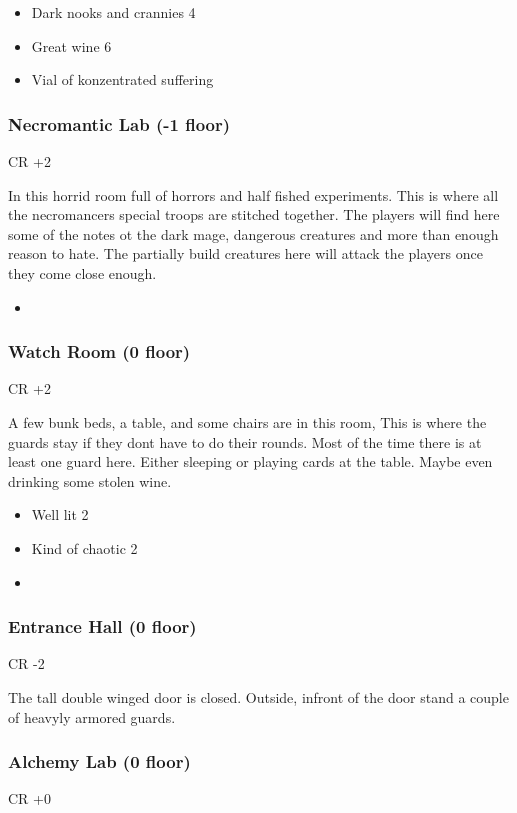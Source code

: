\documentclass[11pt]{article}
\begin{document}
{\begin{itemize}
\item Dark nooks and crannies 4
\item Great wine 6
\item Vial of konzentrated suffering
\end{itemize}
\subsubsection{Necromantic Lab (-1 floor)}
\label{sec:org19afacc}
CR +2

In this horrid room full of horrors and half fished experiments. This is where all the necromancers special troops are stitched together. The players will find here some of the notes ot the dark mage, dangerous creatures and more than enough reason to hate. The partially build creatures here will attack the players once they come close enough.

\begin{itemize}
\item 
\end{itemize}
\subsubsection{Watch Room (0 floor)}
\label{sec:org179de58}
CR +2

A few bunk beds, a table, and some chairs are in this room, This is where the guards stay if they dont have to do their rounds. Most of the time there is at least one guard here. Either sleeping or playing cards at the table. Maybe even drinking some stolen wine.

\begin{itemize}
\item Well lit 2
\item Kind of chaotic 2
\item 
\end{itemize}
\subsubsection{Entrance Hall (0 floor)}
\label{sec:org138bf4f}
CR -2

The tall double winged door is closed. Outside, infront of the door stand a couple of heavyly armored guards.
\subsubsection{Alchemy Lab (0 floor)}
\label{sec:org153dce7}
CR +0

}
\end{document}
